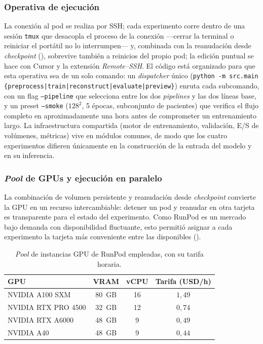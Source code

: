 \subsubsection{Operativa de ejecución}

La conexión al pod se realiza por SSH; cada experimento corre dentro de
una sesión \texttt{tmux} que desacopla el proceso de la conexión
---cerrar la terminal o reiniciar el portátil no lo interrumpen--- y,
combinada con la reanudación desde \textit{checkpoint}
(), sobrevive también a reinicios del propio pod;
la edición puntual se hace con Cursor y la extensión \textit{Remote--SSH}.
El código está organizado para que esta operativa sea de un solo comando:
un \emph{dispatcher} único
(\texttt{python -m src.main \{preprocess|train|reconstruct|evaluate|preview\}})
enruta cada subcomando, con un flag \texttt{--pipeline} que selecciona
entre los dos \textit{pipelines} y las dos líneas base, y un preset
\texttt{--smoke} ($128^2$, 5 épocas, subconjunto de pacientes) que
verifica el flujo completo en aproximadamente una hora antes de
comprometer un entrenamiento largo. La infraestructura compartida (motor
de entrenamiento, validación, E/S de volúmenes, métricas) vive en módulos
comunes, de modo que los cuatro experimentos difieren únicamente en la
construcción de la entrada del modelo y en su inferencia.

\subsubsection{\textit{Pool} de GPUs y ejecución en paralelo}
\label{subsec:pet-pool-gpu}

La combinación de volumen persistente y reanudación desde
\textit{checkpoint} convierte la GPU en un recurso intercambiable:
detener un pod y reanudar en otra tarjeta es transparente para el estado
del experimento. Como RunPod es un mercado bajo demanda con
disponibilidad fluctuante, esto permitió asignar a cada experimento la
tarjeta más conveniente entre las disponibles ().

\begin{table}[h!]
    \centering
    \small
    \begin{tabular}{lccc}
        \toprule
        GPU & VRAM & vCPU & Tarifa (USD/h) \\
        \midrule
        NVIDIA A100 SXM      & 80~GB & 16 & $1{,}49$ \\
        NVIDIA RTX PRO 4500  & 32~GB & 12 & $0{,}74$ \\
        NVIDIA RTX A6000     & 48~GB &  9 & $0{,}49$ \\
        NVIDIA A40           & 48~GB &  9 & $0{,}44$ \\
        \bottomrule
    \end{tabular}
    \caption{\textit{Pool} de instancias GPU de RunPod empleadas, con
    su tarifa horaria.}
    \label{tab:pet-gpus}
\end{table}

